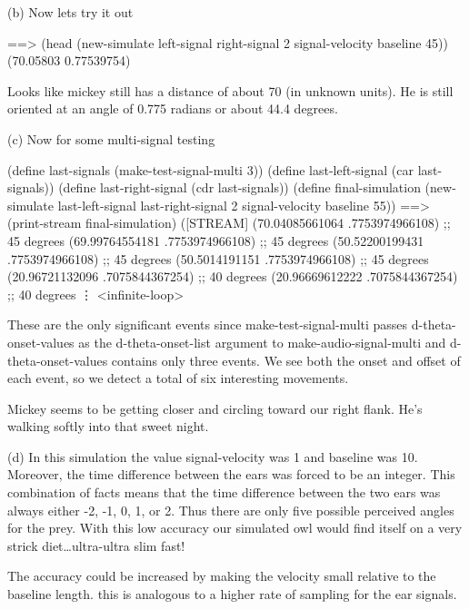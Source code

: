 (b) Now lets try it out

\beginlisp
==> (head (new-simulate left-signal right-signal 2 signal-velocity baseline 45))
(70.05803 0.77539754)
\endlisp

Looks like mickey still has a distance of about 70 (in unknown units).
He is still oriented at an angle of 0.775 radians or about 44.4 degrees.

(c) Now for some multi-signal testing

\beginlisp
(define last-signals      (make-test-signal-multi 3))
(define last-left-signal  (car last-signals))
(define last-right-signal (cdr last-signals))
\null
(define final-simulation
  (new-simulate last-left-signal last-right-signal 2 signal-velocity baseline 55))
\null
==> (print-stream final-simulation)
([STREAM] (70.04085661064 .7753974966108)   ;; 45 degrees
          (69.99764554181 .7753974966108)   ;; 45 degrees
          (50.52200199431 .7753974966108)   ;; 45 degrees
          (50.5014191151  .7753974966108)   ;; 45 degrees
          (20.96721132096 .7075844367254)   ;; 40 degrees
          (20.96669612222 .7075844367254)   ;; 40 degrees
          \vdots
          <infinite-loop>
\endlisp

These are the only significant events since {\cf make-test-signal-multi} passes
{\cf d-theta-onset-values} as the {\cf d-theta-onset-list} argument to {\cf
make-audio-signal-multi} and {\cf d-theta-onset-values} contains only three events. We
see both the onset and offset of each event, so we detect a total of six
interesting movements.

Mickey seems to be getting closer and circling toward our right flank. He's
walking softly into that sweet night.

(d) In this simulation the value {\cf signal-velocity} was 1 and {\cf baseline}
was 10. Moreover, the time difference between the ears was forced to be an
integer. This combination of facts means that the time difference between the
two ears was always either -2, -1, 0, 1, or 2. Thus there are only five possible
perceived angles for the prey. With this low accuracy our simulated owl would
find itself on a very strick diet\ldots ultra-ultra slim fast!

The accuracy could be increased by making the velocity small relative to the
baseline length. this is analogous to a higher rate of sampling for the ear
signals.



